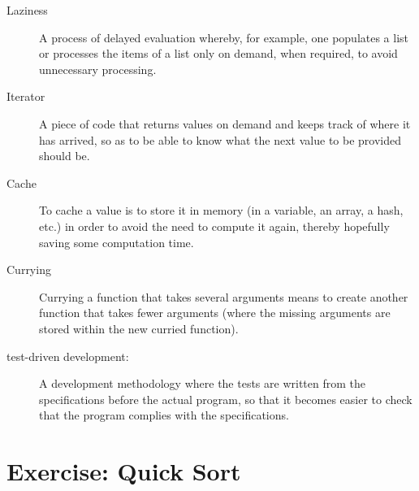 \begin{description}
\item[Laziness] A process of delayed evaluation whereby, for 
example, one populates a list or processes the items of a list only 
on demand, when required, to avoid unnecessary processing.

\item[Iterator] A piece of code that returns values on demand 
and keeps track of where it has arrived, so as to be able 
to know what the next value to be provided should be.

\item[Cache] To cache a value is to store it in memory (in a 
variable, an array, a hash, etc.) in order to avoid the need to 
compute it again, thereby hopefully saving some computation time.

\item[Currying] Currying a function that takes several 
arguments means to create another function that takes fewer 
arguments (where the missing arguments are stored within 
the new curried function).

\item[test-driven development:] A development methodology 
where the tests are written from the specifications before 
the actual program, so that it becomes easier to check that 
the program complies with the specifications.

\end{description}

\section{Exercise: Quick Sort}
\label{quicksort}

